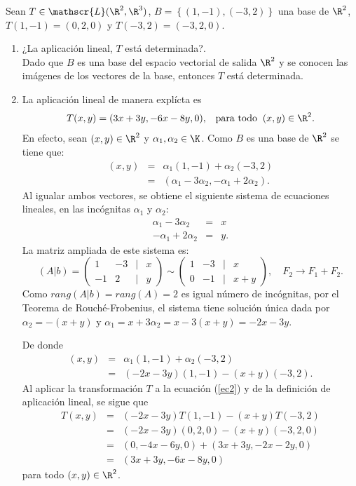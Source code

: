 \documentclass[compacto,10pt]{pubciencias-notas}
\begin{document}
\begin{ejem}
    Sean $T \in \mathscr{L}(\R^{2}, \R^{3})$,  $B=\left\{(1, -1), (-3, 2) \right\}$ una base de $\R^2$,  $T(1, -1)=(0, 2, 0)$ y $T(-3, 2) = (-3, 2, 0)$.
\begin{enumerate}
    \item ¿La aplicación lineal, $T$ está determinada?.\\
    Dado que $B$ es una base  del espacio vectorial de salida $\R^2$ y se conocen las im\'agenes de los vectores de la base, entonces $T$ está determinada. 
    \item La aplicaci\'on lineal de manera expl\'icta es
    \[
        T(x, y) = (3x+3y, -6x-8y, 0), \;\;\; \text{para todo}\;\; (x, y) \in \R^{2}.
    \]
En efecto, sean $(x,y)\in\R^2$ y $\alpha_1,\alpha_2\in\K$. Como $B$ es una base de $\R^2$ se tiene que:
\begin{eqnarray*}
(x,y)&=&\alpha_1(1,-1)+\alpha_2(-3,2)\\
&=&(\alpha_1-3\alpha_2,-\alpha_1+2\alpha_2).
\end{eqnarray*}
Al igualar ambos vectores, se obtiene el siguiente sistema de ecuaciones lineales, en las inc\'ognitas $\alpha_1$ y $\alpha_2$:
\begin{eqnarray*}
\alpha_1-3\alpha_2&=&x\\
-\alpha_1+2\alpha_2&=&y.
\end{eqnarray*}
La matriz ampliada de este sistema es:
\[(A|b)=\begin{pmatrix}1&-3&|&x\\-1&2&|&y\end{pmatrix}\sim\begin{pmatrix}1&-3&|&x\\0&-1&|&x+y\end{pmatrix}, \quad F_2\to F_1+F_2.\]
Como $rang(A|b)=rang(A)=2$ es igual n\'umero de inc\'ognitas, por el Teorema de Rouch\'e-Frobenius, el sistema tiene soluci\'on \'unica dada por $\alpha_2=-(x+y)$ y $\alpha_1=x+3\alpha_2=x-3(x+y)=-2x-3y$.

De donde
\begin{eqnarray}
(x,y)&=&\alpha_1(1,-1)+\alpha_2(-3,2) \nonumber\\
&=&(-2x-3y)(1,-1)-(x+y)(-3,2).\label{ec2}
\end{eqnarray}
Al aplicar la transformaci\'on $T$ a la ecuaci\'on (\ref{ec2}) y de la definici\'on de aplicaci\'on lineal, se sigue que
\begin{eqnarray*}
T(x,y)&=&(-2x-3y)T(1,-1)-(x+y)T(-3,2)\\
&=&(-2x-3y)(0,2,0)-(x+y)(-3,2,0)\\
&=&(0,-4x-6y,0)+(3x+3y,-2x-2y,0)\\
&=&(3x+3y,-6x-8y,0)
\end{eqnarray*}
para todo $(x, y) \in \R^{2}$.
\end{enumerate}

\end{ejem}
\end{document}
